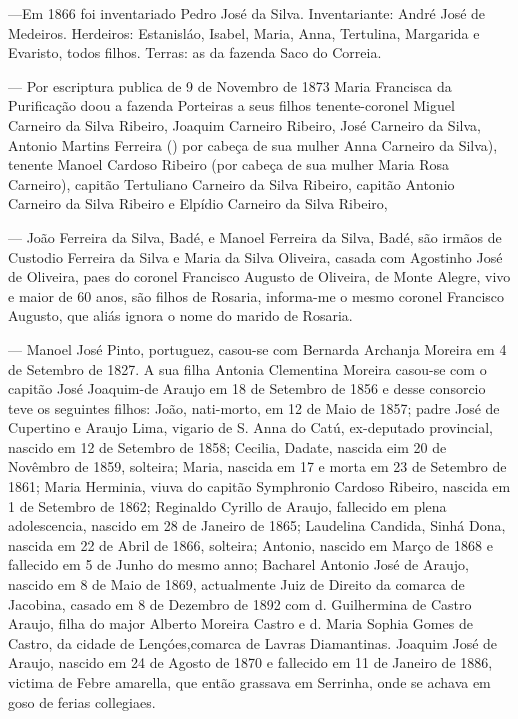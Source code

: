 —Em 1866 foi inventariado Pedro José da Silva. Inventariante: André José de Medeiros. Herdeiros: Estanisláo, Isabel, Maria, Anna, Tertulina, Margarida e Evaristo, todos filhos. Terras: as da fazenda Saco do Correia.

— Por escriptura publica de 9 de Novembro de 1873 Maria Francisca da Purificação doou a fazenda Porteiras a seus filhos tenente-coronel Miguel Carneiro da Silva Ribeiro, Joaquim Carneiro Ribeiro, José Carneiro da Silva, Antonio Martins Ferreira () por cabeça de sua mulher Anna Carneiro da Silva), tenente Manoel Cardoso Ribeiro (por cabeça de sua mulher Maria Rosa Carneiro), capitão Tertuliano Carneiro da Silva Ribeiro, capitão Antonio Carneiro da Silva Ribeiro e Elpídio Carneiro da Silva Ribeiro,

— João Ferreira da Silva, Badé, e Manoel Ferreira da Silva, Badé, são irmãos de Custodio Ferreira da Silva e Maria da Silva Oliveira, casada com Agostinho José de Oliveira, paes do coronel Francisco Augusto de Oliveira, de Monte Alegre, vivo e maior de 60 anos, são filhos de Rosaria, informa-me o mesmo coronel Francisco Augusto, que aliás ignora o nome do marido de Rosaria.


— Manoel José Pinto, portuguez, casou-se com Bernarda Archanja Moreira em 4 de Setembro de 1827. A sua filha Antonia Clementina Moreira casou-se com o capitão José Joaquim-de Araujo em 18 de Setembro de 1856 e desse consorcio teve os seguintes filhos: João, nati-morto, em 12 de Maio de 1857; padre José de Cupertino e Araujo Lima, vigario de S. Anna do Catú, ex-deputado provincial, nascido em 12 de Setembro de 1858; Cecilia, Dadate, nascida eim 20 de Novêmbro de 1859, solteira; Maria, nascida em 17 e morta em 23 de Setembro de 1861; Maria Herminia, viuva do capitão Symphronio Cardoso Ribeiro, nascida em 1 de Setembro de 1862; Reginaldo Cyrillo de Araujo, fallecido em plena adolescencia, nascido em 28 de Janeiro de 1865; Laudelina Candida, Sinhá Dona, nascida em 22 de Abril de 1866, solteira; Antonio, nascido em Março de 1868 e fallecido em 5 de Junho do mesmo anno; Bacharel Antonio José de Araujo, nascido em 8 de Maio de 1869, actualmente Juiz de Direito da comarca de Jacobina, casado em 8 de Dezembro de 1892 com d. Guilhermina de Castro Araujo, filha do major Alberto Moreira Castro e d. Maria Sophia Gomes de Castro, da cidade de Lençóes,comarca de Lavras Diamantinas. Joaquim José de Araujo, nascido em 24 de Agosto de 1870 e fallecido em 11 de Janeiro de 1886, victima de Febre amarella, que então grassava em Serrinha, onde se achava em goso de ferias collegiaes. 


